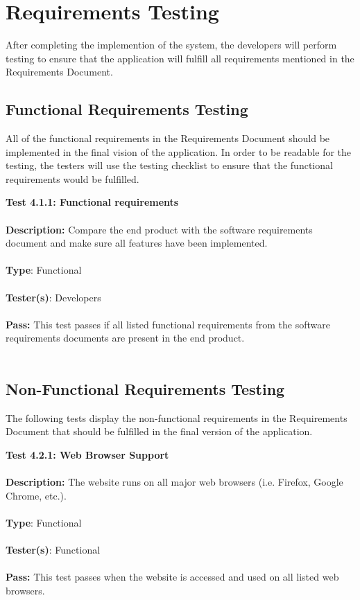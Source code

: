 \documentclass[12pt]{article}
\begin{document}
\section{Requirements Testing}
After completing the implemention of the system, the developers will perform testing to ensure that the application will fulfill all requirements mentioned in the Requirements Document.

\subsection{Functional Requirements Testing}
All of the functional requirements in the Requirements Document should be implemented in the final vision of the application. In order to be readable for the testing, the testers will use the testing checklist to ensure that the functional requirements would be fulfilled.

\begin{tcolorbox}
\textbf{Test 4.1.1: Functional requirements } \\ \\
\textbf{Description:} Compare the end product with the software requirements document and make sure all features have been implemented. \\ \\
\textbf{Type}: Functional \\ \\
\textbf{Tester(s)}: Developers \\ \\
\textbf{Pass:} This test passes if all listed functional requirements from the software requirements documents are present in the end product. \\ \\
\end{tcolorbox}

\subsection{Non-Functional Requirements Testing}
The following tests display the non-functional requirements in the Requirements Document that should be fulfilled in the final version of the application. 

\begin{tcolorbox}
\textbf{Test 4.2.1: Web Browser Support} \\ \\
\textbf{Description:} The website runs on all major web browsers (i.e. Firefox, Google Chrome, etc.). \\ \\
\textbf{Type}: Functional \\ \\
\textbf{Tester(s)}: Functional \\ \\
\textbf{Pass:} This test passes when the website is accessed and used on all listed web browsers. \\ \\
\end{tcolorbox}
\end{document}

